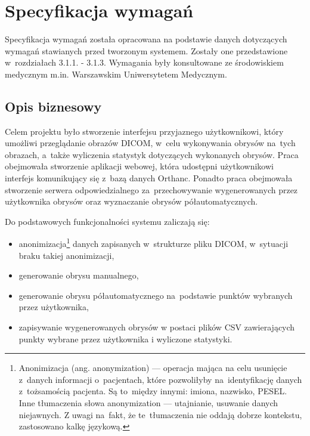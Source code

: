 \documentclass[a4paper,11pt,twoside,openright]{report}
\theoremstyle{definition}
\begin{document}
\section {Specyfikacja wymagań}

Specyfikacja wymagań została opracowana na podstawie danych dotyczących wymagań stawianych
przed tworzonym systemem. Zostały one przedstawione w~rozdziałach 3.1.1. - 3.1.3. Wymagania
były konsultowane ze %
środowiskiem medycznym m.in. Warszawskim Uniwersytetem Medycznym.

\subsection {Opis biznesowy}

Celem projektu było stworzenie interfejsu przyjaznego użytkownikowi, który umożliwi
przeglądanie obrazów DICOM, w~celu wykonywania obrysów na~tych obrazach, a~także wyliczenia
statystyk dotyczących wykonanych obrysów. Praca
obejmowała stworzenie aplikacji webowej, która udostępni użytkownikowi interfejs
komunikujący się z~bazą danych Orthanc. Ponadto praca obejmowała stworzenie serwera
odpowiedzialnego za~przechowywanie wygenerowanych przez użytkownika obrysów oraz
wyznaczanie obrysów półautomatycznych.

Do podstawowych funkcjonalności systemu zaliczają się:
\begin{itemize}[noitemsep]
\item anonimizacja\footnote {Anonimizacja (ang. anonymization) --- operacja mająca
na celu usunięcie z~danych informacji o~pacjentach, które pozwoliłyby na~identyfikację
danych z~tożsamością pacjenta. Są to~między innymi: imiona, nazwisko, PESEL.
Inne tłumaczenia słowa anonymization --- utajnianie, usuwanie danych niejawnych.
Z uwagi na~fakt, że te~tłumaczenia nie oddają dobrze kontekstu, zastosowano kalkę
językową.} danych zapisanych w~strukturze pliku DICOM, w~sytuacji braku takiej anonimizacji,
\item generowanie obrysu manualnego,
\item generowanie obrysu półautomatycznego na~podstawie punktów wybranych przez użytkownika,
\item zapisywanie wygenerowanych obrysów w postaci plików CSV zawierających
punkty wybrane przez użytkownika i wyliczone statystyki.
\end{itemize}
\end{document}
